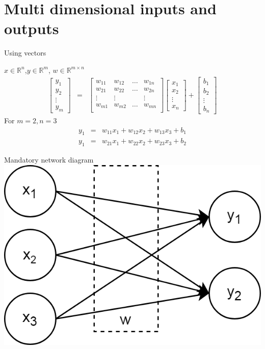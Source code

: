 \section{Multi dimensional inputs and outputs}
\begin{frame}{Using vectors}

		\begin{block}{$x \in \mathbb{R}^n$,$y \in \mathbb{R}^m$, $w\in \mathbb{R}^{m \times n}$}
			\begin{align*}
				\begin{bmatrix}
					y_1 \\
					y_2 \\
					\vdots \\
					y_m
				\end{bmatrix} & = & 
				\begin{bmatrix}
					w_{11} & w_{12}& \dots & w_{1n}  \\
					w_{21} & w_{22}& \dots & w_{2n}  \\
					\vdots &\vdots &  & \vdots  \\
					w_{m1} & w_{m2}& \dots & w_{mn}  \\
				\end{bmatrix}
			\begin{bmatrix}
				x_1 \\
				x_2 \\
				\vdots \\
				x_n
			\end{bmatrix} + 
			\begin{bmatrix}
			b_1 \\
			b_2 \\
			\vdots \\
			b_n
			\end{bmatrix}
			\end{align*}
		For $m=2, n=3$
		\begin{align*}
		y_1 &=& w_{11}x_1 + w_{12}x_2+w_{13}x_3 + b_1 \\
		y_1 &=& w_{21}x_1 + w_{22}x_2+w_{23}x_3 + b_2 
		\end{align*}
		\end{block}
\end{frame}
\begin{frame}{Mandatory network diagram}
	\includegraphics[width=.6\textwidth, center]{figuras/fully_connected_0_layer.png}	
\end{frame}

